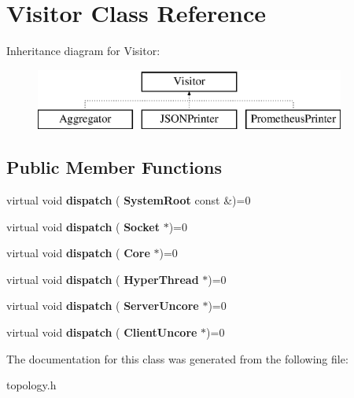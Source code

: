 \section{Visitor Class Reference}
\label{classVisitor}
Inheritance diagram for Visitor\+:\begin{figure}[H]
\begin{center}
\leavevmode
\includegraphics[height=2.000000cm]{classVisitor}
\end{center}
\end{figure}
\subsection*{Public Member Functions}
\begin{DoxyCompactItemize}
\item 
\mbox{\label{classVisitor_a2767f23757168647579b897c03d0ee77}} 
virtual void {\bfseries dispatch} (\textbf{ System\+Root} const \&)=0
\item 
\mbox{\label{classVisitor_a3f6fb477092d77682591ef3a44e02e0c}} 
virtual void {\bfseries dispatch} (\textbf{ Socket} $\ast$)=0
\item 
\mbox{\label{classVisitor_a4b57eb5cd83ed0eef1781c90e6b5d42b}} 
virtual void {\bfseries dispatch} (\textbf{ Core} $\ast$)=0
\item 
\mbox{\label{classVisitor_a932ec97ba065daccbca5f3dec9915fe4}} 
virtual void {\bfseries dispatch} (\textbf{ Hyper\+Thread} $\ast$)=0
\item 
\mbox{\label{classVisitor_aab72a0fd55ff52b6f35ffdc151757d17}} 
virtual void {\bfseries dispatch} (\textbf{ Server\+Uncore} $\ast$)=0
\item 
\mbox{\label{classVisitor_ad33adac50e64a9ad03dde5e3bae472dc}} 
virtual void {\bfseries dispatch} (\textbf{ Client\+Uncore} $\ast$)=0
\end{DoxyCompactItemize}


The documentation for this class was generated from the following file\+:\begin{DoxyCompactItemize}
\item 
topology.\+h\end{DoxyCompactItemize}
